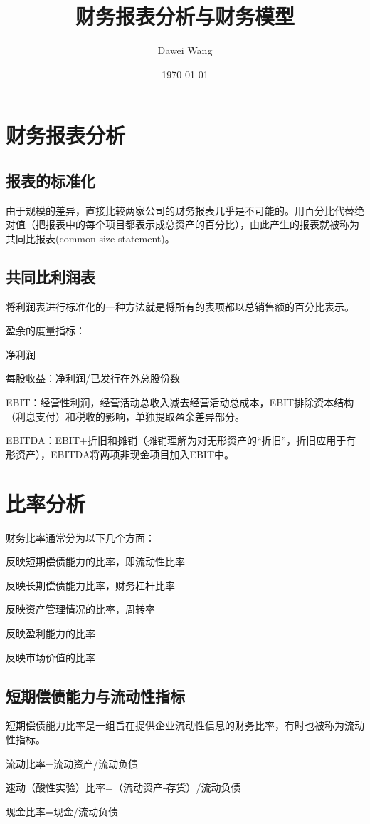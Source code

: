 \documentclass{article}
\title{财务报表分析与财务模型}
\author{Dawei Wang}
\date{\today}
\begin{document}
	\maketitle
\section{财务报表分析}
\subsection{报表的标准化}
由于规模的差异，直接比较两家公司的财务报表几乎是不可能的。用百分比代替绝对值（把报表中的每个项目都表示成总资产的百分比），由此产生的报表就被称为共同比报表(common-size statement)。
\subsection{共同比利润表}
将利润表进行标准化的一种方法就是将所有的表项都以总销售额的百分比表示。

盈余的度量指标：

净利润

每股收益：净利润/已发行在外总股份数

EBIT：经营性利润，经营活动总收入减去经营活动总成本，EBIT排除资本结构（利息支付）和税收的影响，单独提取盈余差异部分。

EBITDA：EBIT+折旧和摊销（摊销理解为对无形资产的“折旧”，折旧应用于有形资产），EBITDA将两项非现金项目加入EBIT中。

\section{比率分析}
财务比率通常分为以下几个方面：

反映短期偿债能力的比率，即流动性比率

反映长期偿债能力比率，财务杠杆比率

反映资产管理情况的比率，周转率

反映盈利能力的比率

反映市场价值的比率

\subsection{短期偿债能力与流动性指标}
短期偿债能力比率是一组旨在提供企业流动性信息的财务比率，有时也被称为流动性指标。

流动比率=流动资产/流动负债

速动（酸性实验）比率=（流动资产-存货）/流动负债

现金比率=现金/流动负债
\end{document}
